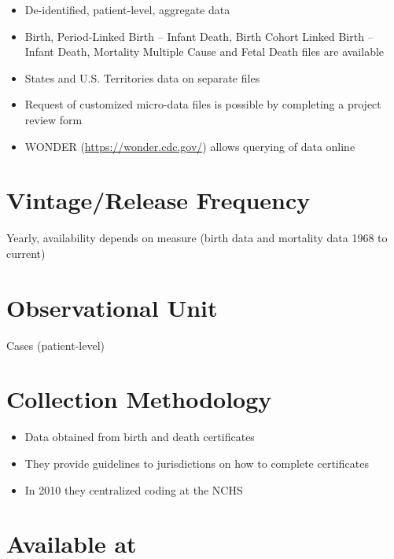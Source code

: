 \documentclass[
]{book}
\providecommand{\tightlist}{%
  \setlength{\itemsep}{0pt}\setlength{\parskip}{0pt}}
\begin{document}
\begin{itemize}
\tightlist
\item
  De-identified, patient-level, aggregate data
\item
  Birth, Period-Linked Birth -- Infant Death, Birth Cohort Linked Birth -- Infant Death, Mortality Multiple Cause and Fetal Death files are available
\item
  States and U.S. Territories data on separate files
\item
  Request of customized micro-data files is possible by completing a project review form
\item
  WONDER (\url{https://wonder.cdc.gov/}) allows querying of data online
\end{itemize}

\hypertarget{vintagerelease-frequency-67}{%
\section{Vintage/Release Frequency}\label{vintagerelease-frequency-67}}

Yearly, availability depends on measure (birth data and mortality data 1968 to current)

\hypertarget{observational-unit-67}{%
\section{Observational Unit}\label{observational-unit-67}}

Cases (patient-level)

\hypertarget{collection-methodology-67}{%
\section{Collection Methodology}\label{collection-methodology-67}}

\begin{itemize}
\tightlist
\item
  Data obtained from birth and death certificates
\item
  They provide guidelines to jurisdictions on how to complete certificates
\item
  In 2010 they centralized coding at the NCHS
\end{itemize}

\hypertarget{available-at-67}{%
\section{Available at}\label{available-at-67}}
\end{document}
